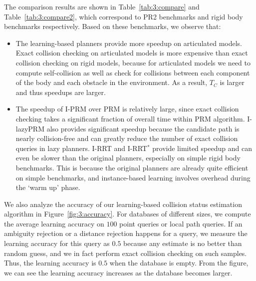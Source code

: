 The comparison results are shown in Table~\ref{tab:3:compare} and Table~\ref{tab:3:compare2}, which correspond to PR2 benchmarks and rigid body benchmarks respectively. Based on these benchmarks, we observe that:
\begin{itemize}
\item The learning-based planners provide more speedup on articulated models. Exact collision checking on articulated models is more expensive than exact collision checking on rigid models, because for articulated models we need to compute self-collision as well as check for collisions between each component of the body and each obstacle in the environment. As a result, $T_C$ is larger and thus speedups are larger.
\item The speedup of I-PRM over PRM is relatively large, since exact collision checking takes a significant fraction of overall time within PRM algorithm. I-lazyPRM also provides significant speedup because the candidate path is nearly collision-free and can greatly reduce the number of exact collision queries in lazy planners. I-RRT and I-RRT${}^*$ provide limited speedup and can even be slower than the original planners, especially on simple rigid body benchmarks. This is because the original planners are already quite efficient on simple benchmarks, and instance-based learning involves overhead during the `warm up' phase.
\end{itemize}


We also analyze the accuracy of our learning-based collision status estimation algorithm in Figure~\ref{fig:3:accuracy}. For databases of different sizes, we compute the average learning accuracy on $100$ point queries or local path queries. If an ambiguity rejection or a distance rejection happens for a query, we measure the learning accuracy for this query as $0.5$ because any estimate is no better than random guess, and we in fact perform exact collision checking on such samples. Thus, the learning accuracy is $0.5$ when the database is empty. From the figure, we can see the learning accuracy increases as the database becomes larger.


